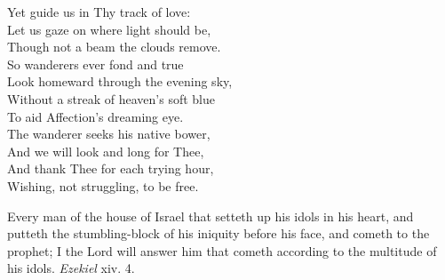  Yet guide us in Thy track of love: \\
 Let us gaze on where light should be, \\
 Though not a beam the clouds remove. \\
  So wanderers ever fond and true \\
 Look homeward through the evening sky, \\
 Without a streak of heaven’s soft blue \\
 To aid Affection’s dreaming eye. \\
  The wanderer seeks his native bower, \\
 And we will look and long for Thee, \\
 And thank Thee for each trying hour, \\
 Wishing, not struggling, to be free.\\


Every man of the house of Israel that setteth up his idols in his heart, and putteth the stumbling-block of his iniquity before his face, and cometh to the prophet; I the Lord will answer him that cometh according to the multitude of his idols.  \emph{Ezekiel} xiv. 4.

